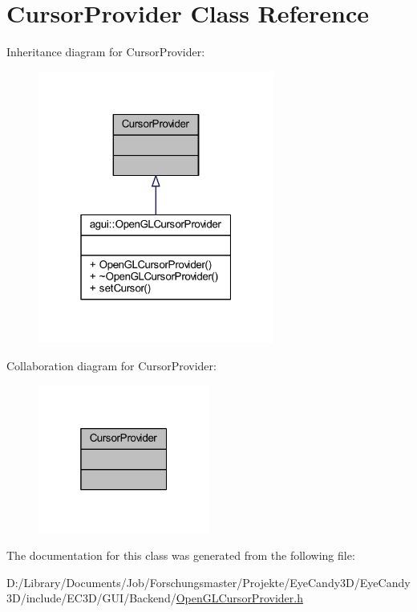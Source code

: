\hypertarget{class_cursor_provider}{}\section{Cursor\+Provider Class Reference}
\label{class_cursor_provider}


Inheritance diagram for Cursor\+Provider\+:\nopagebreak
\begin{figure}[H]
\begin{center}
\leavevmode
\includegraphics[width=220pt]{class_cursor_provider__inherit__graph}
\end{center}
\end{figure}


Collaboration diagram for Cursor\+Provider\+:\nopagebreak
\begin{figure}[H]
\begin{center}
\leavevmode
\includegraphics[width=160pt]{class_cursor_provider__coll__graph}
\end{center}
\end{figure}


The documentation for this class was generated from the following file\+:\begin{DoxyCompactItemize}
\item 
D\+:/\+Library/\+Documents/\+Job/\+Forschungsmaster/\+Projekte/\+Eye\+Candy3\+D/\+Eye\+Candy3\+D/include/\+E\+C3\+D/\+G\+U\+I/\+Backend/\mbox{\hyperlink{_open_g_l_cursor_provider_8h}{Open\+G\+L\+Cursor\+Provider.\+h}}\end{DoxyCompactItemize}
